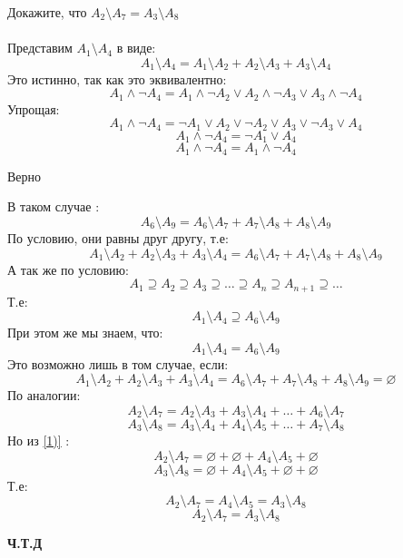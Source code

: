 \documentclass[a4paper,12pt]{article}
\begin{document}
Докажите, что $A_2 \setminus A_7 = A_3 \setminus A_8 $
\\\\
Представим $A_1 \setminus A_4 $ в виде:
\[
A_1 \setminus A_4 = A_1 \setminus A_2 + A_2 \setminus A_3 + A_3 \setminus A_4
\]
Это истинно, так как это эквивалентно:
\[
A_1 \wedge \neg A_4 = A_1 \wedge \neg A_2 \vee A_2 \wedge \neg A_3 \vee A_3 \wedge \neg A_4
\]
Упрощая:
\[
A_1 \wedge \neg A_4 = \neg A_1 \vee A_2 \vee \neg A_2 \vee A_3 \vee \neg A_3 \vee A_4
\]
\[
A_1 \wedge \neg A_4 = \neg A_1 \vee A_4
\]
\[
A_1 \wedge \neg A_4 = A_1 \wedge \neg A_4
\]
\begin{center}
Верно
\end{center}
В таком случае : 
\[
A_6 \setminus A_9 = A_6 \setminus A_7 + A_7 \setminus A_8 + A_8 \setminus A_9
\]
По условию, они равны друг другу, т.е:
\[
A_1 \setminus A_2 + A_2 \setminus A_3 + A_3 \setminus A_4 = A_6 \setminus A_7 + A_7 \setminus A_8 + A_8 \setminus A_9
\]
А так же по условию:
\[
A_1 \supseteq A_2 \supseteq A_3 \supseteq \ldots  \supseteq A_n \supseteq A_{n+1} \supseteq \ldots
\]
Т.е:
\[
A_1 \setminus A_4 \supseteq A_6 \setminus A_9
\]
При этом же мы знаем, что:
\[
A_1 \setminus A_4 = A_6 \setminus A_9
\]
Это возможно лишь в том случае, если:
\begin{equation}\label{1)}
A_1 \setminus A_2 + A_2 \setminus A_3 + A_3 \setminus A_4 = A_6 \setminus A_7 + A_7 \setminus A_8 + A_8 \setminus A_9 = \varnothing
\end{equation}
По аналогии:
\[
A_2 \setminus A_7 = A_2 \setminus A_3 + A_3 \setminus A_4 + \ldots + A_6 \setminus A_7
\]
\[
A_3 \setminus A_8 = A_3 \setminus A_4 + A_4 \setminus A_5 + \ldots + A_7 \setminus A_8
\]
Но из \ref{1)} :
\[
A_2 \setminus A_7 = \varnothing + \varnothing + A_4 \setminus A_5 + \varnothing
\]
\[
A_3 \setminus A_8 = \varnothing + A_4 \setminus A_5 + \varnothing + \varnothing 
\]
Т.е:
\[
A_2 \setminus A_7 = A_4 \setminus A_5 = A_3 \setminus A_8
\]
\[
A_2 \setminus A_7 = A_3 \setminus A_8
\]
\begin{center}
\textbf{Ч.Т.Д}
\end{center}
\end{document}
